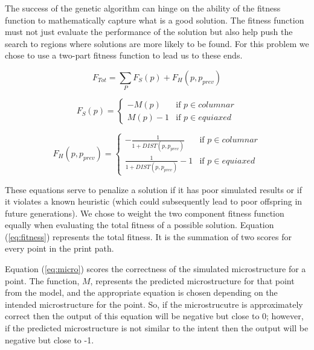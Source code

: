 \documentclass[a4paper]{article}
\begin{document}
The success of the genetic algorithm can hinge on the ability of the fitness function to mathematically capture what is a good solution. The fitness function must not just evaluate the performance of the solution but also help push the search to regions where solutions are more likely to be found. For this problem we chose to use a two-part fitness function to lead us to these ends. 

\begin{equation}
\label{eq:fitness}
F_{Tot} = \sum_{P} F_{S}(p) + F_{H}(p, p_{prev})
\end{equation}

\begin{equation}
\label{eq:micro}
F_{S}(p) = \begin{cases} 
            -M(p) & \text{if $p \in columnar$} \\
            M(p) - 1 & \text{if $p \in equiaxed$}
            \end{cases}
\end{equation}

\begin{equation}
\label{eq:heuristic}
F_{H}(p, p_{prev}) = \begin{cases} 
                        -\frac{1}{1 + DIST(p, p_{prev})}  & \text{if $p \in columnar$} \\
                        \frac{1}{1 + DIST(p, p_{prev})} - 1 & \text{if $p \in equiaxed$}
                        \end{cases}
\end{equation}

These equations serve to penalize a solution if it has poor simulated results or if it violates a known heuristic (which could subsequently lead to poor offspring in future generations). We chose to weight the two component fitness function equally when evaluating the total fitness of a possible solution. Equation (\ref{eq:fitness}) represents the total fitness. It is the summation of two scores for every point in the print path. 

Equation (\ref{eq:micro}) scores the correctness of the simulated microstructure for a point. The function, $M$, represents the predicted microstructure for that point from the model, and the appropriate equation is chosen depending on the intended microstructure for the point. So, if the microstrucutre is approximately correct then the output of this equation will be negative but close to 0; however, if the predicted microstructure is not similar to the intent then the output will be negative but close to -1.
\end{document}
